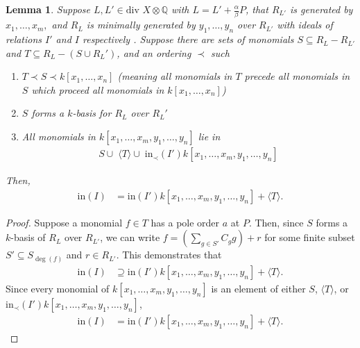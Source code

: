\documentclass{amsart}
\theoremstyle{plain}
\newtheorem{lem}[thm]{Lemma}
\theoremstyle{definition}
\theoremstyle{remark}
\numberwithin{equation}{section}
\newcommand\BQ{{\mathbb Q}}
\newcommand \di{\text{div }}
\newcommand \halfcan{L}
\newcommand \initial{\text{in}}
\begin{document}
\begin{lem}\label{lem:relations_from_generators_induction} 
Suppose $\halfcan, \halfcan' \in \di X \otimes \BQ$ with $\halfcan=\halfcan'+\frac{\alpha}{\beta}P$, that $R_{\halfcan'}$ is generated by $x_1, \ldots, x_m,$
and $R_{\halfcan}$ is minimally generated by $y_1, \ldots, y_n$ over 
$R_{\halfcan'}$ with ideals of relations $I'$ and $I$ respectively .  
Suppose there are sets of monomials $S\subseteq R_\halfcan-R_{\halfcan'}$ and $T\subseteq R_\halfcan-(S\cup R_\halfcan')$, and an ordering $\prec$ such 
\begin{enumerate}
\item[(\ref{lem:relations_from_generators_induction}.1)]   $T\prec S\prec k[x_1, \ldots, x_n]$ (meaning all monomials in $T$ precede all monomials in $S$ which proceed all monomials in $k[x_1, \ldots, x_n]$)
\item[(\ref{lem:relations_from_generators_induction}.2)] $S$ forms a $k$-basis for $R_\halfcan$ over $R_\halfcan'$
\item[(\ref{lem:relations_from_generators_induction}.3)] All monomials in $k[x_1, \ldots, x_m, y_1, \ldots, y_n]$ lie in 
\begin{align*}
	S	\cup \; \langle T\rangle \cup \; \initial_\prec(I') k[x_1, \ldots, x_m, y_1, \ldots, y_n]
\end{align*}
\end{enumerate}
Then,
\begin{align*}
	\initial(I) & = \initial(I') k[x_1, \ldots, x_m, y_1, \ldots, y_n]
	+ \langle T \rangle.
\end{align*}
\end{lem}
\begin{proof}
Suppose a monomial $f\in T$ has a pole order $a$ at $P$. Then, since $S$ forms a $k$-basis of $R_{\halfcan}$ over $R_{\halfcan'}$, we can write $f = (\sum_{g\in S'} C_g g)+r$ for some finite subset $S'\subseteq S_{\deg(f)}$ and $r\in R_{\halfcan'}$.  This demonstrates that 
\begin{align*}
	\initial(I) & \supseteq \initial(I') k[x_1, \ldots, x_m, y_1, \ldots, y_n] + \langle T \rangle.
\end{align*}
Since every monomial of $k[x_1, \ldots, x_m, y_1, \ldots, y_n]$ is an element of either $S$, $\langle T\rangle$, or $\initial_\prec(I') k[x_1, \ldots, x_m, y_1, \ldots, y_n]$,
\begin{align*}
	\initial(I) & = \initial(I') k[x_1, \ldots, x_m, y_1, \ldots, y_n] + \langle T \rangle.
\end{align*}
\end{proof}
\end{document}

